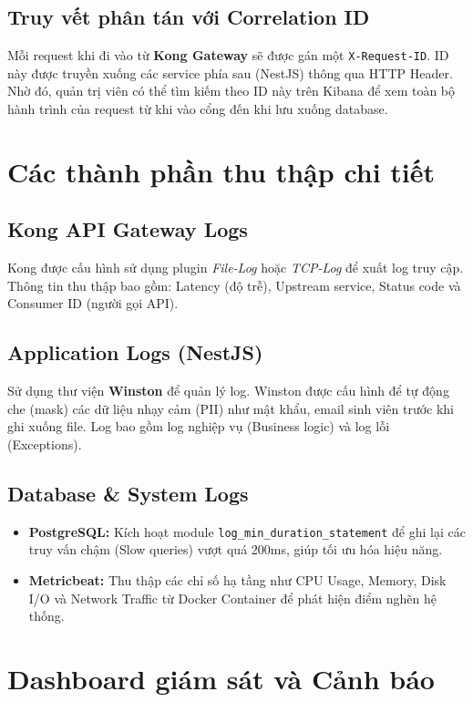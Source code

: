 \subsection{Truy vết phân tán với Correlation ID}
Mỗi request khi đi vào từ \textbf{Kong Gateway} sẽ được gán một \texttt{X-Request-ID}. ID này được truyền xuống các service phía sau (NestJS) thông qua HTTP Header. Nhờ đó, quản trị viên có thể tìm kiếm theo ID này trên Kibana để xem toàn bộ hành trình của request từ khi vào cổng đến khi lưu xuống database.

\section{Các thành phần thu thập chi tiết}

\subsection{Kong API Gateway Logs}
Kong được cấu hình sử dụng plugin \textit{File-Log} hoặc \textit{TCP-Log} để xuất log truy cập. Thông tin thu thập bao gồm: Latency (độ trễ), Upstream service, Status code và Consumer ID (người gọi API).

\subsection{Application Logs (NestJS)}
Sử dụng thư viện \textbf{Winston} để quản lý log. Winston được cấu hình để tự động che (mask) các dữ liệu nhạy cảm (PII) như mật khẩu, email sinh viên trước khi ghi xuống file. Log bao gồm log nghiệp vụ (Business logic) và log lỗi (Exceptions).

\subsection{Database \& System Logs}
\begin{itemize}
    \item \textbf{PostgreSQL:} Kích hoạt module \texttt{log\_min\_duration\_statement} để ghi lại các truy vấn chậm (Slow queries) vượt quá 200ms, giúp tối ưu hóa hiệu năng.
    \item \textbf{Metricbeat:} Thu thập các chỉ số hạ tầng như CPU Usage, Memory, Disk I/O và Network Traffic từ Docker Container để phát hiện điểm nghẽn hệ thống.
\end{itemize}

\section{Dashboard giám sát và Cảnh báo}

